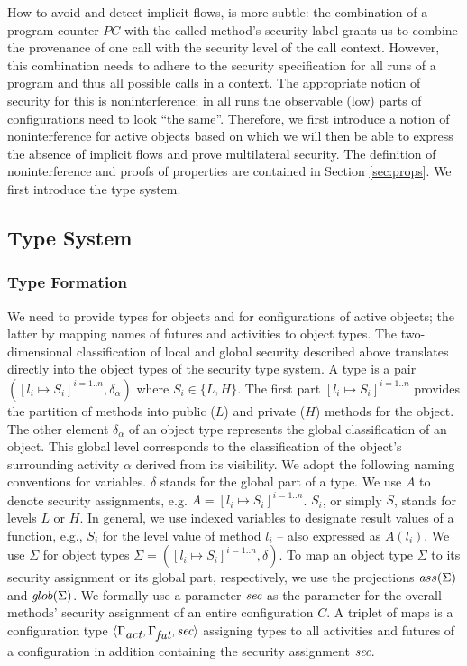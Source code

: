 \documentclass[10pt, conference, compsocconf]{IEEEtran}
\newcommand{\symb}[1]{\makebox{\it #1}}
\begin{document}
{How to avoid and detect implicit flows, is more subtle: the combination of a program counter $PC$
with the called method's security label grants us to combine the provenance of one call with the
security level of the call context. However, this combination needs to adhere to the security specification 
for all runs of a program and thus all possible calls in a context. The appropriate notion of security
for this is noninterference: in all runs the observable (low) parts of configurations need to look
``the same''.  Therefore,  we first introduce a notion of noninterference for active objects 
based on which we will then 
be able to express the absence of implicit flows and prove multilateral security.
The definition of noninterference and proofs of properties are contained in Section 
\ref{sec:props}. We first introduce the type system.

\subsection{Type System}
\label{sec:typesformal}
\subsubsection*{Type Formation}
We need to provide types for objects and for configurations of active objects;
the latter by mapping names of futures and activities to object types.
The two-dimensional classification of local and global security described above
translates directly into the object types of the security type system.
A type is a pair  $([l_i \mapsto S_i]^{i=1..n}, \delta_\alpha)$ where $S_i \in \{L, H\}$.
The first part $[l_i \mapsto  S_i]^{i=1..n}$ provides the partition of methods into 
public ($L$) and private ($H$) methods for the object. 
The other element $\delta_\alpha$ of an object type represents the global
classification of an object. This global level corresponds to the
classification of the object's surrounding activity $\alpha$ derived from its visibility.
We adopt the following naming conventions for variables.
$\delta$ stands for the global part of a type.
We use $A$ to denote security assignments, e.g. $A = [l_i \mapsto S_i]^{i=1..n}$.
$S_i$, or simply $S$, stands for levels $L$ or $H$.
In general, we use indexed variables to designate result values of a function, 
e.g., $S_i$ for the level value of method $l_i$ -- also expressed as $A(l_i)$.
We use $\Sigma$ for object types $\Sigma = ([l_i \mapsto S_i]^{i=1..n}, \delta)$.
To map an object type $\Sigma$ to its security assignment or its global part,
respectively, we use the projections ${\symb ass}(\Sigma)$ and ${\symb glob}(\Sigma)$.
We formally use a parameter $\symb{sec}$ as the parameter for the overall 
methods' security assignment of an entire configuration $C$. 
A triplet of maps is a configuration type 
$\langle \Gamma_{\symb{act}}, \Gamma_{\symb{fut}}, \symb{sec} \rangle$ 
assigning types to all activities and futures of a configuration in addition containing 
the security assignment $\symb{sec}$.

}
\end{document}
